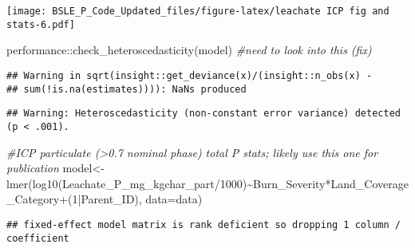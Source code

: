\documentclass[
]{article}
\newenvironment{Shaded}{\begin{snugshade}}{\end{snugshade}}
\newcommand{\AttributeTok}[1]{\textcolor[rgb]{0.77,0.63,0.00}{#1}}
\newcommand{\CommentTok}[1]{\textcolor[rgb]{0.56,0.35,0.01}{\textit{#1}}}
\newcommand{\DecValTok}[1]{\textcolor[rgb]{0.00,0.00,0.81}{#1}}
\newcommand{\FunctionTok}[1]{\textcolor[rgb]{0.00,0.00,0.00}{#1}}
\newcommand{\NormalTok}[1]{#1}
\newcommand{\OtherTok}[1]{\textcolor[rgb]{0.56,0.35,0.01}{#1}}
\newcommand{\SpecialCharTok}[1]{\textcolor[rgb]{0.00,0.00,0.00}{#1}}
\begin{document}
\texttt{[image: BSLE\_P\_Code\_Updated\_files/figure-latex/leachate ICP fig and stats-6.pdf]}

\begin{Shaded}
\begin{Highlighting}[]
\NormalTok{performance}\SpecialCharTok{::}\FunctionTok{check\_heteroscedasticity}\NormalTok{(model) }\CommentTok{\#need to look into this (fix)}
\end{Highlighting}
\end{Shaded}

\begin{verbatim}
## Warning in sqrt(insight::get_deviance(x)/(insight::n_obs(x) -
## sum(!is.na(estimates)))): NaNs produced
\end{verbatim}

\begin{verbatim}
## Warning: Heteroscedasticity (non-constant error variance) detected (p < .001).
\end{verbatim}

\begin{Shaded}
\begin{Highlighting}[]
\CommentTok{\#ICP particulate (\textgreater{}0.7 nominal phase) total P stats; likely use this one for publication}
\NormalTok{model}\OtherTok{\textless{}{-}}\FunctionTok{lmer}\NormalTok{(}\FunctionTok{log10}\NormalTok{(Leachate\_P\_mg\_kgchar\_part}\SpecialCharTok{/}\DecValTok{1000}\NormalTok{)}\SpecialCharTok{\textasciitilde{}}\NormalTok{Burn\_Severity}\SpecialCharTok{*}\NormalTok{Land\_Coverage\_Category}\SpecialCharTok{+}\NormalTok{(}\DecValTok{1}\SpecialCharTok{|}\NormalTok{Parent\_ID), }\AttributeTok{data=}\NormalTok{data)}
\end{Highlighting}
\end{Shaded}

\begin{verbatim}
## fixed-effect model matrix is rank deficient so dropping 1 column / coefficient
\end{verbatim}
\end{document}
